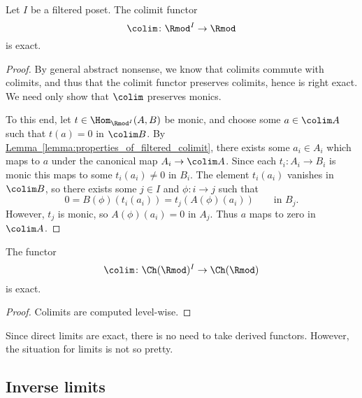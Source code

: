 \documentclass[main.tex]{subfiles}
\begin{document}
\begin{theorem}
  \label{thm:filtered_colimit_left_exact}
  Let $I$ be a filtered poset. The colimit functor
  \begin{equation*}
    \colim\colon \Rmod^{I} \to \Rmod
  \end{equation*}
  is exact.
\end{theorem}
\begin{proof}
  By general abstract nonsense, we know that colimits commute with colimits, and thus that the colimit functor preserves colimits, hence is right exact. We need only show that $\colim$ preserves monics.

  To this end, let $t \in \Hom_{\Rmod^{I}}(A, B)$ be monic, and choose some \(a \in \colim A\) such that \(t(a) = 0\) in \(\colim B\). By \hyperref[lemma:properties_of_filtered_colimit]{Lemma~\ref*{lemma:properties_of_filtered_colimit}}, there exists some \(a_{i} \in A_{i}\) which maps to \(a\) under the canonical map \(A_{i} \to \colim A\). Since each \(t_{i}\colon A_{i} \to B_{i}\) is monic this maps to some \(t_{i}(a_{i}) \neq 0\) in \(B_{i}\). The element \(t_{i}(a_{i})\) vanishes in \(\colim B\), so there exists some \(j \in I\) and \(\phi\colon i \to j\) such that
  \begin{equation*}
    0 = B(\phi)(t_{i}(a_{i})) = t_{j}(A(\phi)(a_{i}))\qquad\text{in }B_{j}.
  \end{equation*}
  However, \(t_{j}\) is monic, so \(A(\phi)(a_{i}) = 0\) in \(A_{j}\). Thus \(a\) maps to zero in \(\colim A\).
\end{proof}

\begin{corollary}
  \label{cor:filtered_colimits_into_chain_complexes}
  The functor
  \begin{equation*}
    \colim\colon \Ch(\Rmod)^{I} \to \Ch(\Rmod)
  \end{equation*}
  is exact.
\end{corollary}
\begin{proof}
  Colimits are computed level-wise.
\end{proof}

Since direct limits are exact, there is no need to take derived functors. However, the situation for limits is not so pretty.

\subsection{Inverse limits}
\label{ssc:inverse_limits}
\end{document}
